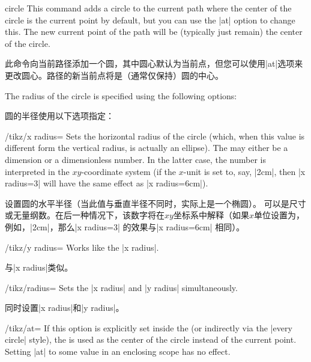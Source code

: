 \begin{pathoperation}{circle}{}
    This command adds a circle to the current path where the center of the
    circle is the current point by default, but you can use the |at| option to
    change this. The new current point of the path will be (typically just
    remain) the center of the circle.

    此命令向当前路径添加一个圆，其中圆心默认为当前点，但您可以使用|at|选项来更改圆心。路径的新当前点将是（通常仅保持）圆的中心。



    The radius of the circle is specified using the following options:

    圆的半径使用以下选项指定：

    \begin{key}{/tikz/x radius=}
        Sets the horizontal radius of the circle (which, when this value is
        different form the vertical radius, is actually an ellipse). The
         may either be a dimension or a dimensionless number. In
        the latter case, the number is interpreted in the $xy$-coordinate
        system (if the $x$-unit is set to, say, |2cm|, then |x radius=3| will
        have the same effect as |x radius=6cm|).

        设置圆的水平半径（当此值与垂直半径不同时，实际上是一个椭圆）。  可以是尺寸或无量纲数。在后一种情况下，该数字将在$xy$坐标系中解释（如果$x$单位设置为，例如，|2cm|，那么|x radius=3| 的效果与|x radius=6cm| 相同）。

    \end{key}
    \begin{key}{/tikz/y radius=}
        Works like the |x radius|.

        与|x radius|类似。

    \end{key}
    \begin{key}{/tikz/radius=}
        Sets the |x radius| and |y radius| simultaneously.

        同时设置|x radius|和|y radius|。

    \end{key}
    \begin{key}{/tikz/at=}
        If this option is explicitly set inside the  (or
        indirectly via the |every circle| style), the  is used
        as the center of the circle instead of the current point. Setting |at|
        to some value in an enclosing scope has no effect.


\end{key}
\end{pathoperation}
